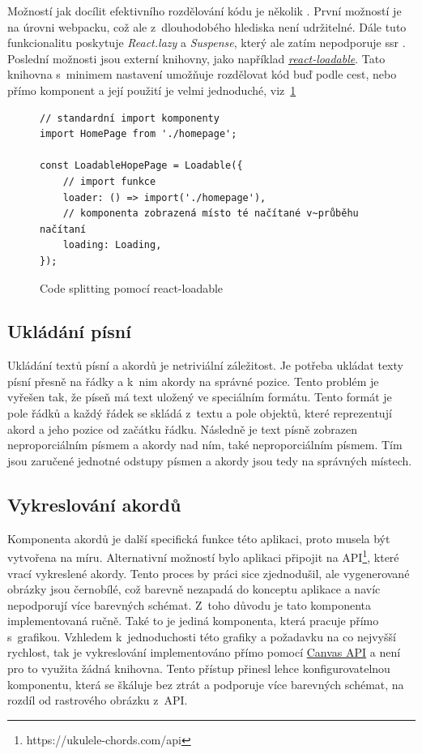 Možností jak docílit efektivního rozdělování kódu je několik \cite{facebookinc_2018_codesplitting}. První možností je na úrovni webpacku, což ale z~dlouhodobého hlediska není udržitelné. Dále tuto funkcionalitu poskytuje \emph{React.lazy} a \emph{Suspense}, který ale zatím nepodporuje \acrshort{ssr} \cite{facebookinc_2018_codesplitting}. Poslední možnosti jsou externí knihovny, jako například \href{https://github.com/jamiebuilds/react-loadable}{\emph{react-loadable}}. Tato knihovna s~minimem nastavení umožňuje rozdělovat kód buď podle cest, nebo přímo komponent a její použití je velmi jednoduché, viz~\ref{code:code_splitting}

\begin{figure}[h!]
    \centering
    \begin{verbatim}
// standardní import komponenty
import HomePage from './homepage';

const LoadableHopePage = Loadable({
    // import funkce
    loader: () => import('./homepage'),
    // komponenta zobrazená místo té načítané v~průběhu načítaní
    loading: Loading,
});
    \end{verbatim}
    \caption{Code splitting pomocí react-loadable}
    \label{code:code_splitting}
\end{figure}

\subsection{Ukládání písní}
\label{ss:song_saving}
Ukládání textů písní a akordů je netriviální záležitost. Je potřeba ukládat texty písní přesně na řádky a k~nim akordy na správné pozice. Tento problém je vyřešen tak, že píseň má text uložený ve speciálním formátu. Tento formát je pole řádků a každý řádek se skládá z~textu a pole objektů, které reprezentují akord a jeho pozice od začátku řádku. Následně je text písně zobrazen neproporciálním písmem a akordy nad ním, také neproporciálním písmem. Tím jsou zaručené jednotné odstupy písmen a akordy jsou tedy na správných místech.

\subsection{Vykreslování akordů}
\label{ss:chords_render}
Komponenta akordů je další specifická funkce této aplikaci, proto musela být vytvořena na míru. Alternativní možností bylo aplikaci připojit na API\footnote{https://ukulele-chords.com/api}, které vrací vykreslené akordy. Tento proces by práci sice zjednodušil, ale vygenerované obrázky jsou černobílé, což barevně nezapadá do konceptu aplikace a navíc nepodporují více barevných schémat. Z~toho důvodu je tato komponenta implementovaná ručně. Také to je jediná komponenta, která pracuje přímo s~grafikou. Vzhledem k~jednoduchosti této grafiky a požadavku na co nejvyšší rychlost, tak je vykreslování implementováno přímo pomocí \href{https://developer.mozilla.org/en-US/docs/Web/API/Canvas_API}{Canvas API} a není pro to využita žádná knihovna. Tento přístup přinesl lehce konfigurovatelnou komponentu, která se škáluje bez ztrát a podporuje více barevných schémat, na rozdíl od rastrového obrázku z~API.

